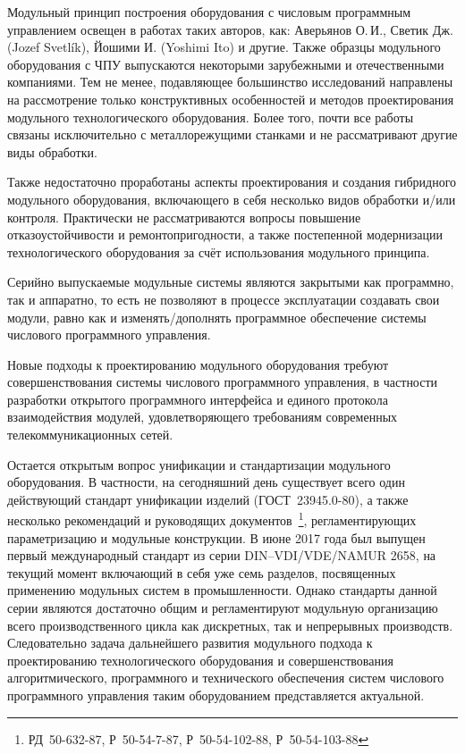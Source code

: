 Модульный принцип построения оборудования с числовым программным управлением освещен в работах таких авторов, как: Аверьянов О.\,И., Светик Дж. (Jozef Svetlík), Йошими И. (Yoshimi Ito) и другие. Также образцы модульного оборудования с ЧПУ выпускаются некоторыми зарубежными и отечественными компаниями. Тем не менее, подавляющее большинство исследований направлены на рассмотрение только конструктивных особенностей и методов проектирования модульного технологического оборудования. Более того, почти все работы связаны исключительно с металлорежущими станками и не рассматривают другие виды обработки.

Также недостаточно проработаны аспекты проектирования и создания гибридного модульного оборудования, включающего в себя несколько видов обработки и/или контроля. Практически не рассматриваются вопросы повышение отказоустойчивости и ремонтопригодности, а также постепенной модернизации технологического оборудования за счёт использования модульного принципа.

Серийно выпускаемые модульные системы являются закрытыми как программно, так и аппаратно, то есть не позволяют в процессе эксплуатации создавать свои модули, равно как и изменять/дополнять программное обеспечение системы числового программного управления. 

Новые подходы к проектированию модульного оборудования требуют совершенствования системы числового программного управления, в частности разработки открытого программного интерфейса и единого протокола взаимодействия модулей, удовлетворяющего требованиям современных телекоммуникационных сетей.

Остается открытым вопрос унификации и стандартизации модульного оборудования. В частности, на сегодняшний день существует всего один действующий стандарт унификации изделий (ГОСТ~23945.0-80), а также несколько рекомендаций и руководящих документов~\footnote{РД~50-632-87, Р~50-54-7-87, Р~50-54-102-88, Р~50-54-103-88}, регламентирующих параметризацию и модульные конструкции. В июне 2017 года был выпущен первый международный стандарт из серии DIN--VDI/VDE/NAMUR 2658, на текущий момент включающий в себя уже семь разделов, посвященных применению модульных систем в промышленности. Однако стандарты данной серии являются достаточно общим и регламентируют модульную организацию всего производственного цикла как дискретных, так и непрерывных производств. Следовательно задача дальнейшего развития модульного подхода к проектированию технологического оборудования и совершенствования алгоритмического, программного и технического обеспечения систем числового программного управления таким оборудованием представляется актуальной.  

